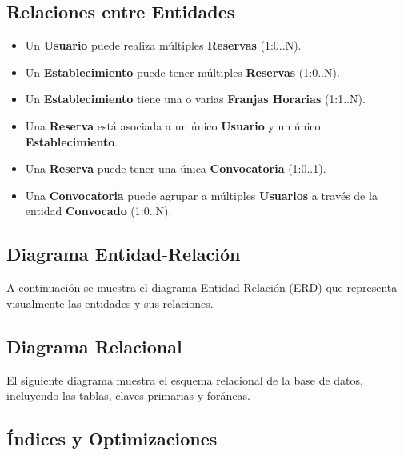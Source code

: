 \subsection{Relaciones entre Entidades}
\begin{itemize}
    \item Un \textbf{Usuario} puede realiza múltiples \textbf{Reservas} (1:0..N).
    \item Un \textbf{Establecimiento} puede tener múltiples \textbf{Reservas} (1:0..N).
    \item Un \textbf{Establecimiento} tiene una o varias \textbf{Franjas Horarias} (1:1..N).
    \item Una \textbf{Reserva} está asociada a un único \textbf{Usuario} y un único \textbf{Establecimiento}.
    \item Una \textbf{Reserva} puede tener una única \textbf{Convocatoria} (1:0..1).
    \item Una \textbf{Convocatoria} puede agrupar a múltiples \textbf{Usuarios} a través de la entidad \textbf{Convocado} (1:0..N).
\end{itemize}

\newpage

\subsection{Diagrama Entidad-Relación}

A continuación se muestra el diagrama Entidad-Relación (ERD) que representa visualmente las entidades y sus relaciones.


\newpage

\subsection{Diagrama Relacional}

El siguiente diagrama muestra el esquema relacional de la base de datos, incluyendo las tablas, claves primarias y foráneas.


\newpage

\subsection{Índices y Optimizaciones}

